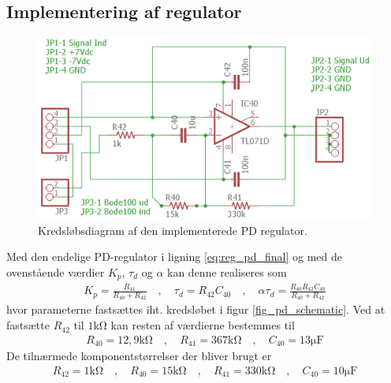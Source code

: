 \subsection{Implementering af regulator}
\begin{figure}[h!]
\centering
\includegraphics[width=.8\textwidth]{billeder/pd_schematic.png}
\caption{Kredsløbsdiagram af den implementerede PD regulator.}
\label{fig:pd_schematic}
\end{figure}
Med den endelige PD-regulator i ligning \ref{eq:reg_pd_final} og med de ovenstående værdier $K_p$, $\tau_d$ og $\alpha$ kan denne realiseres \cite[s. 349]{Reg2015} som
\begin{align}
K_p = \frac{R_{41}}{R_{40} + R_{42}} \quad , \quad \tau_d = R_{42}C_{40} \quad, \quad \alpha\tau_d = \frac{R_{40} R_{42} C_{40}}{R_{40} + R_{42}}
\end{align}
hvor parameterne fastsættes iht. kredsløbet i figur \ref{fig_pd_schematic}.
Ved at fastsætte $R_{42}$ til $1\si{\kilo\ohm}$ kan resten af værdierne bestemmes til
\begin{align}
R_{40}=12,9\si{\kilo\ohm} \quad, \quad R_{41}=367\si{\kilo\ohm} \quad, \quad C_{40} = 13\si{\micro\farad}
\end{align}
De tilnærmede komponentstørrelser der bliver brugt er
\begin{align}
R_{42}=1\si{\kilo\ohm} \quad, \quad R_{40}=15\si{\kilo\ohm} \quad, \quad R_{41}=330\si{\kilo\ohm} \quad, \quad C_{40} = 10\si{\micro\farad}
\end{align}


